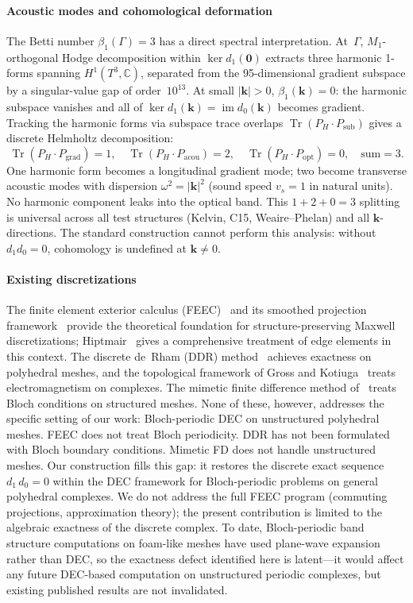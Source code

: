 \documentclass[preprint,12pt]{elsarticle}
\begin{document}
\paragraph{Acoustic modes and cohomological deformation}
The Betti number $\beta_1(\Gamma) = 3$ has a direct spectral interpretation. At~$\Gamma$, $M_1$-orthogonal Hodge decomposition within $\ker d_1(\mathbf{0})$ extracts three harmonic 1-forms spanning $H^1(T^3, \mathbb{C})$, separated from the 95-dimensional gradient subspace by a singular-value gap of order~$10^{13}$. At small $|\mathbf{k}| > 0$, $\beta_1(\mathbf{k}) = 0$: the harmonic subspace vanishes and all of $\ker d_1(\mathbf{k}) = \operatorname{im} d_0(\mathbf{k})$ becomes gradient. Tracking the harmonic forms via subspace trace overlaps $\operatorname{Tr}(P_H \cdot P_{\mathrm{sub}})$ gives a discrete Helmholtz decomposition:
\[
  \operatorname{Tr}(P_H \cdot P_{\mathrm{grad}}) = 1, \quad
  \operatorname{Tr}(P_H \cdot P_{\mathrm{acou}}) = 2, \quad
  \operatorname{Tr}(P_H \cdot P_{\mathrm{opt}}) = 0, \quad
  \text{sum} = 3.
\]
One harmonic form becomes a longitudinal gradient mode; two become transverse acoustic modes with dispersion $\omega^2 = |\mathbf{k}|^2$ (sound speed $v_s = 1$ in natural units). No harmonic component leaks into the optical band. This $1{+}2{+}0 = 3$ splitting is universal across all test structures (Kelvin, C15, Weaire--Phelan) and all $\mathbf{k}$-directions. The standard construction cannot perform this analysis: without $d_1 d_0 = 0$, cohomology is undefined at $\mathbf{k} \neq 0$.

\paragraph{Existing discretizations}
The finite element exterior calculus (FEEC)~\cite{Arnold2006,Arnold2010} and its smoothed projection framework~\cite{Christiansen2008} provide the theoretical foundation for structure-preserving Maxwell discretizations; Hiptmair~\cite{Hiptmair2002} gives a comprehensive treatment of edge elements in this context. The discrete de~Rham (DDR) method~\cite{DiPietro2020} achieves exactness on polyhedral meshes, and the topological framework of Gross and Kotiuga~\cite{Gross2004} treats electromagnetism on complexes. The mimetic finite difference method of~\cite{Jin2025} treats Bloch conditions on structured meshes. None of these, however, addresses the specific setting of our work: Bloch-periodic DEC on unstructured polyhedral meshes. FEEC does not treat Bloch periodicity. DDR has not been formulated with Bloch boundary conditions. Mimetic FD does not handle unstructured meshes. Our construction fills this gap: it restores the discrete exact sequence $d_1\,d_0 = 0$ within the DEC framework for Bloch-periodic problems on general polyhedral complexes. We do not address the full FEEC program (commuting projections, approximation theory); the present contribution is limited to the algebraic exactness of the discrete complex. To date, Bloch-periodic band structure computations on foam-like meshes have used plane-wave expansion~\cite{Klatt2019} rather than DEC, so the exactness defect identified here is latent---it would affect any future DEC-based computation on unstructured periodic complexes, but existing published results are not invalidated.
\end{document}
